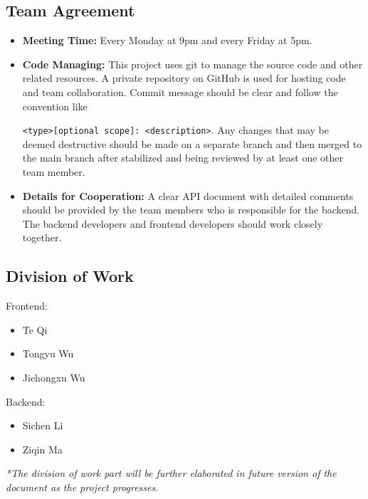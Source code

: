 \documentclass{article}
\begin{document}
\subsection{Team Agreement}
\begin{itemize}
  \item \textbf{Meeting Time:} Every Monday at 9pm and every Friday at 5pm.
  \item \textbf{Code Managing:} This project uses git to manage the source code and other related resources. 
  A private repository on GitHub is used for hosting code and team collaboration. Commit message should be 
  clear and follow the convention like \par \verb|<type>[optional scope]: <description>|. Any changes that may be 
  deemed destructive should be made on a separate branch and then merged to the main branch after stabilized 
  and being reviewed by at least one other team member.
  \item \textbf{Details for Cooperation:} A clear API document with detailed comments should be provided by the 
  team members who is responsible for the backend. The backend developers and frontend developers should work 
  closely together.
\end{itemize}
\subsection{Division of Work}
Frontend: 
\begin{itemize}
  \item Te Qi
  \item Tongyu Wu
  \item Jiehongxu Wu
\end{itemize}
Backend:
\begin{itemize}
  \item Sichen Li
  \item Ziqin Ma
\end{itemize}

\textit{*The division of work part will be further elaborated in future version of the document as the project progresses.}
\end{document}
